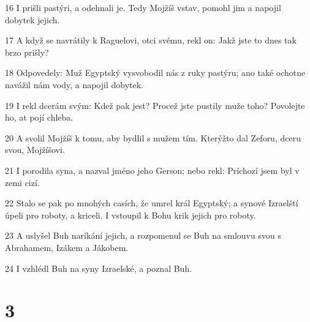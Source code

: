 \par 16 I prišli pastýri, a odehnali je. Tedy Mojžíš vstav, pomohl jim a napojil dobytek jejich.
\par 17 A když se navrátily k Raguelovi, otci svému, rekl on: Jakž jste to dnes tak brzo prišly?
\par 18 Odpovedely: Muž Egyptský vysvobodil nás z ruky pastýru; ano také ochotne navážil nám vody, a napojil dobytek.
\par 19 I rekl dcerám svým: Kdež pak jest? Procež jste pustily muže toho? Povolejte ho, at pojí chleba.
\par 20 A svolil Mojžíš k tomu, aby bydlil s mužem tím. Kterýžto dal Zeforu, dceru svou, Mojžíšovi.
\par 21 I porodila syna, a nazval jméno jeho Gerson; nebo rekl: Príchozí jsem byl v zemi cizí.
\par 22 Stalo se pak po mnohých casích, že umrel král Egyptský; a synové Izraelští úpeli pro roboty, a kriceli. I vstoupil k Bohu krik jejich pro roboty.
\par 23 A uslyšel Buh naríkání jejich, a rozpomenul se Buh na smlouvu svou s Abrahamem, Izákem a Jákobem.
\par 24 I vzhlédl Buh na syny Izraelské, a poznal Buh.

\chapter{3}

